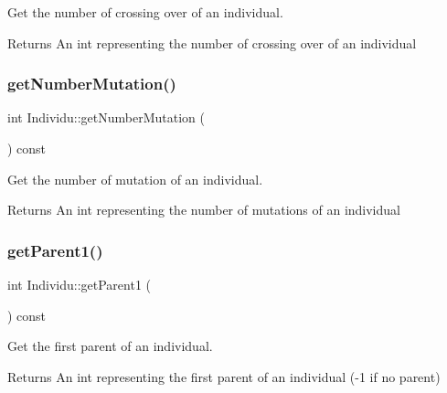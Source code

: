 Get the number of crossing over of an individual. 

\begin{DoxyReturn}{Returns}
An int representing the number of crossing over of an individual 
\end{DoxyReturn}
\mbox{\label{class_individu_ab45051503bc347df2977cded53e89bb8}} 
\subsubsection{\texorpdfstring{get\+Number\+Mutation()}{getNumberMutation()}}
{\footnotesize\ttfamily int Individu\+::get\+Number\+Mutation (\begin{DoxyParamCaption}{ }\end{DoxyParamCaption}) const}



Get the number of mutation of an individual. 

\begin{DoxyReturn}{Returns}
An int representing the number of mutations of an individual 
\end{DoxyReturn}
\mbox{\label{class_individu_aa20d31fdd48f0672fcc5bbc831b96fd3}} 
\subsubsection{\texorpdfstring{get\+Parent1()}{getParent1()}}
{\footnotesize\ttfamily int Individu\+::get\+Parent1 (\begin{DoxyParamCaption}{ }\end{DoxyParamCaption}) const}



Get the first parent of an individual. 

\begin{DoxyReturn}{Returns}
An int representing the first parent of an individual (-\/1 if no parent) 
\end{DoxyReturn}
\mbox{\label{class_individu_a194ba789e23ae0b59491681e91115609}} 
